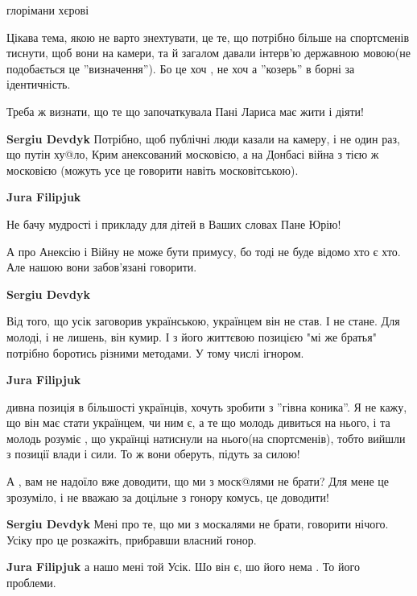 \begin{itemize}
глорімани хєрові


Цікава тема, якою не варто знехтувати, це те, що потрібно більше на спортсменів
тиснути, щоб вони на камери, та й загалом давали інтерв'ю державною мовою(не
подобається це ''визначення''). Бо це хоч , не хоч а ''козерь'' в борні за
ідентичність.

Треба ж визнати, що те що започаткувала Пані Лариса має жити і діяти!

\begin{itemize} %
\textbf{Sergiu Devdyk} 
Потрібно, щоб публічні люди казали на камеру, і не один раз, що путін ху@ло,
Крим анексований московією, а на Донбасі війна з тією ж московією (можуть усе
це говорити навіть московітською).

\textbf{Jura Filipjuk} 

Не бачу мудрості і прикладу для дітей в Ваших словах Пане Юрію!

А про Анексію і Війну не може бути примусу, бо тоді не буде відомо хто є хто.
Але нашою вони забов'язані говорити.

\textbf{Sergiu Devdyk} 

Від того, що усік заговорив українською, українцем він не став. І не стане. Для
молоді, і не лишень, він кумир. І з його життєвою позицією "мі же братья"
потрібно боротись різними методами. У тому числі ігнором.

\textbf{Jura Filipjuk} 

дивна позиція в більшості українців, хочуть зробити з ''гівна коника''. Я не
кажу, що він має стати українцем, чи ним є, а те що молодь дивиться на нього, і
та молодь розуміє , що українці натиснули на нього(на спортсменів), тобто
вийшли з позиції влади і сили. То ж вони оберуть, підуть за силою!

А , вам не надоїло вже доводити, що ми з моск@лями не брати? Для мене це
зрозуміло, і не вважаю за доцільне з гонору комусь, це доводити!


\textbf{Sergiu Devdyk} Мені про те, що ми з москалями не брати, говорити нічого. Усіку про це розкажіть, прибравши власний гонор.

\textbf{Jura Filipjuk} а нашо мені той Усік. Шо він є, шо його нема . То його проблеми.

\end{itemize} %


\end{itemize}
